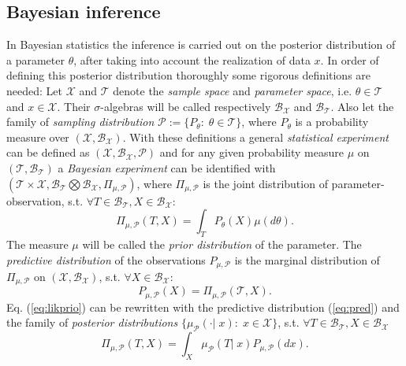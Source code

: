\documentclass[12pt,letterpaper]{article}
\numberwithin{equation}{subsection}
\begin{document}
\subsection{Bayesian inference}
\label{sec:BayInf}
In Bayesian statistics the inference is carried out on the posterior distribution of a parameter $\theta$, after taking into account the realization of data $x$. In order of defining this posterior distribution thoroughly some rigorous definitions are needed:
Let $\mathcal{X}$ and $\mathcal{T}$ denote the \textit{sample space} and \textit{parameter space}, i.e. $\theta \in \mathcal{T}$ and $x \in \mathcal{X}$. Their $\sigma$-algebras will be called respectively $\mathcal{B}_\mathcal{X}$ and $\mathcal{B}_\mathcal{T}$. Also let the family of \textit{sampling distribution} $\mathcal{P} := \{P_\theta :\;\theta \in \mathcal{T}\}$, where $P_\theta$ is a probability measure over $(\mathcal{X}, \mathcal{B}_\mathcal{X})$. With these definitions a general \textit{statistical experiment} can be defined as $(\mathcal{X}, \mathcal{B}_\mathcal{X}, \mathcal{P})$ and for any given probability measure $\mu$ on $(\mathcal{T}, \mathcal{B}_\mathcal{T})$ a \textit{Bayesian experiment} can be identified with $(\mathcal{T}\times\mathcal{X},  \mathcal{B}_\mathcal{T}\bigotimes\mathcal{B}_\mathcal{X}, \Pi_{\mu,\mathcal{P}})$, where $\Pi_{\mu,\mathcal{P}}$ is the joint distribution of parameter-observation, s.t. $\forall T \in \mathcal{B}_\mathcal{T}, X \in \mathcal{B}_\mathcal{X}$:
\begin{equation}
\label{eq:likprio}
\Pi_{\mu,\mathcal{P}}(T,X) = \int_T P_\theta(X)\mu(d\theta ). 
\end{equation} 
The measure $\mu$ will be called the \textit{prior distribution} of the parameter. The \textit{predictive distribution} of the observations $P_{\mu,\mathcal{P}}$ is the marginal distribution of $\Pi_{\mu,\mathcal{P}}$ on $(\mathcal{X}, \mathcal{B}_\mathcal{X})$, s.t. $\forall X \in \mathcal{B}_\mathcal{X}: $
\begin{equation}
P_{\mu,\mathcal{P}}(X) = \Pi_{\mu,\mathcal{P}}(\mathcal{T},X).
\label{eq:pred}
\end{equation}
Eq. (\ref{eq:likprio}) can be rewritten with the predictive distribution (\ref{eq:pred}) and the family of \textit{posterior distributions} $\{\mu_\mathcal{P}(\cdot |\; x):\; x\in\mathcal{X}\}$, s.t. $\forall T \in \mathcal{B}_\mathcal{T}, X \in \mathcal{B}_\mathcal{X}$
\begin{equation}
\label{eq:post}
\Pi_{\mu,\mathcal{P}}(T,X) = \int_X \mu_\mathcal{P}(T|\; x) P_{\mu,\mathcal{P}}(dx ). 
\end{equation} 
\end{document}
